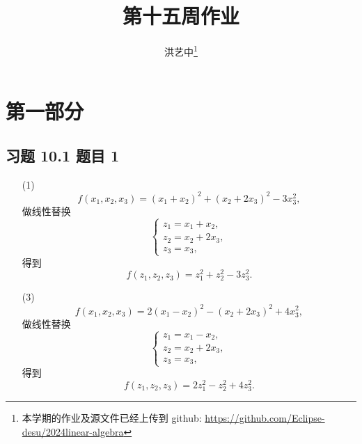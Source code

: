 \title{第十五周作业}
\author{洪艺中\thanks{本学期的作业及源文件已经上传到 {github}: \url{https://github.com/Eclipse-desu/2024linear-algebra}}}
\maketitle
\section{第一部分}
\newcommand{\lvec}[1]{\overrightarrow{#1}}

\subsection*{ 习题 10.1 题目 1 }
\begin{solution}
\begin{enumerate}
    \item[(1)] \[
        f(x_1, x_2, x_3) = (x_1 + x_2)^2 + (x_2 + 2x_3)^2 - 3x_3^2,
    \]
    做线性替换
    \[
    \begin{cases}
        z_1 = x_1 + x_2, \\
        z_2 = x_2 + 2x_3, \\
        z_3 = x_3,
    \end{cases}
    \]
    得到
    \[
        f(z_1, z_2, z_3) = z_1^2 + z_2^2 - 3z_3^2.
    \]
    \item[(3)] \[
        f(x_1, x_2, x_3) = 2(x_1 - x_2)^2 - (x_2 + 2x_3)^2 + 4x_3^2,
    \]
    做线性替换
    \[
    \begin{cases}
        z_1 = x_1 - x_2, \\
        z_2 = x_2 + 2x_3, \\
        z_3 = x_3,
    \end{cases}
    \]
    得到
    \[
        f(z_1, z_2, z_3) = 2z_1^2 - z_2^2 + 4z_3^2.
    \]
\end{enumerate}
\end{solution}

\newpage
